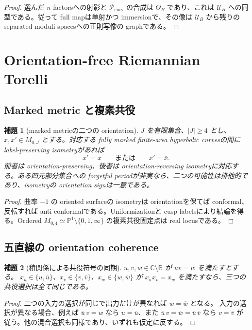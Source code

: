 \documentclass[11pt,a4paper]{ltjsarticle}
\newcommand{\PP}{\mathbb P}
\newcommand{\RR}{\mathbb R}
\newcommand{\CC}{\mathbb C}
\newcommand{\ov}{\overline}
\newcommand{\cP}{\mathcal P}
\newcommand{\cU}{\mathcal U}
\theoremstyle{plain}
\newtheorem{lemma}[lemma]{補題}
\theoremstyle{definition}
\theoremstyle{remark}
\begin{document}
\begin{proof}
選んだ $n$ factorsへの射影と $\cP_{\mathrm{curv}}$ の合成は $\Theta_B$ であり、これは $\cU_B$ への同型である。従って full mapは単射かつ immersionで、その像は $\cU_B$ から残りの separated moduli spacesへの正則写像の graphである。
\end{proof}

\section{Orientation-free Riemannian Torelli}
\label{sec:unoriented}

\subsection{Marked metric と複素共役}
\begin{lemma}[marked metricの二つの orientation]
\label{lem:metric-conjugation}
$J$ を有限集合、$|J|\ge4$ とし、$x,x'\in M_{0,J}$ とする。対応する fully marked finite-area hyperbolic curvesの間に label-preserving isometryがあれば
\[
 x'=x\qquad\text{または}\qquad x'=\ov x.
\]
前者は orientation-preserving、後者は orientation-reversing isometryに対応する。ある四元部分集合への forgetful periodが非実なら、二つの可能性は排他的であり、isometryの orientation signは一意である。
\end{lemma}

\begin{proof}
曲率 $-1$ の oriented surfaceの isometryは orientationを保てば conformal、反転すれば anti-conformalである。Uniformizationと cusp labelsにより結論を得る。Ordered $M_{0,4}\simeq\PP^1\setminus\{0,1,\infty\}$ の複素共役固定点は real locusである。
\end{proof}

\subsection{五直線の orientation coherence}
\begin{lemma}[積関係による共役符号の同期]
\label{lem:product-coherence}
$u,v,w\in\CC\setminus\RR$ が $uv=w$ を満たすとする。
$x_u\in\{u,\ov u\}$、$x_v\in\{v,\ov v\}$、$x_w\in\{w,\ov w\}$ が $x_ux_v=x_w$ を満たすなら、三つの共役選択は全て同じである。
\end{lemma}

\begin{proof}
二つの入力の選択が同じで出力だけが異なれば $w=\ov w$ となる。
入力の選択が異なる場合、例えば $\ov u\,v=w$ なら $u=\ov u$、また $\ov u\,v=\ov w=\ov u\,\ov v$ なら $v=\ov v$ が従う。他の混合選択も同様であり、いずれも仮定に反する。
\end{proof}
\end{document}
